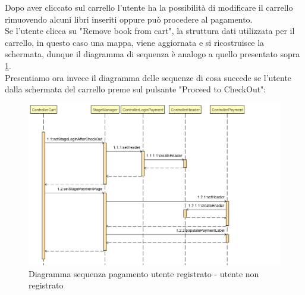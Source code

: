 \documentclass[a4paper,11pt]{report}
\begin{document}
\clearpage
Dopo aver cliccato sul carrello l'utente ha la possibilità di modificare il carrello rimuovendo alcuni libri inseriti oppure può procedere al pagamento.\\
Se l'utente clicca su "Remove book from cart", la struttura dati utilizzata per il carrello, in questo caso una mappa, viene aggiornata e si ricostruisce la schermata, dunque il diagramma di sequenza è analogo a quello presentato sopra \ref{visualizza carrello}.\\
\newline
Presentiamo ora invece il diagramma delle sequenze di cosa succede se l'utente dalla schermata del carrello preme sul pulsante "Proceed to CheckOut":\\
\newline
    \begin{figure}[h!]
    	\centering
    	\includegraphics[width=1.1\linewidth]{Sequence diagrams/2 Order Creation/Proceed To checkout (tolte chiamate inutili a ViewHeader).png}
    	\caption{Diagramma sequenza pagamento utente registrato - utente non registrato}
    	\label{visualizza carrello}
    \end{figure}\\
\end{document}
